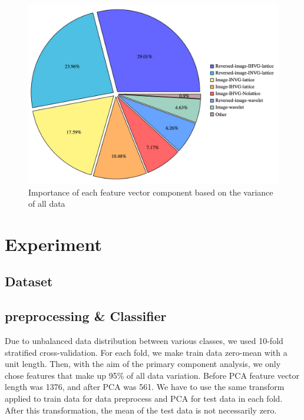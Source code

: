 \documentclass[conference]{IEEEtran}
\begin{document}
\begin{figure}[tbh]
  \includegraphics[width=1\linewidth]{PCA_piechart.png}
      \caption{Importance of each feature vector component based on the variance of all data}
  \label{fig: PCA1}
\end{figure}





\section{Experiment}
\subsection{\textbf{Dataset}}
\subsection{\textbf{preprocessing \& Classifier}}

Due to unbalanced data distribution between various classes, we used 10-fold stratified cross-validation. For each fold, we make train data zero-mean with a unit length. Then, with the aim of the primary component analysis, we only chose features that make up 95\% of all data variation. Before PCA feature vector length was 1376, and after PCA was 561. We have to use the same transform applied to train data for data preprocess and PCA for test data in each fold. After this transformation, the mean of the test data is not necessarily zero.
\end{document}
